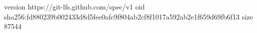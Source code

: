 version https://git-lfs.github.com/spec/v1
oid sha256:fd880239b002433d8d5fee0afc9f804ab2cf8f1017a592ab2e1f659d69fb6f13
size 87544
